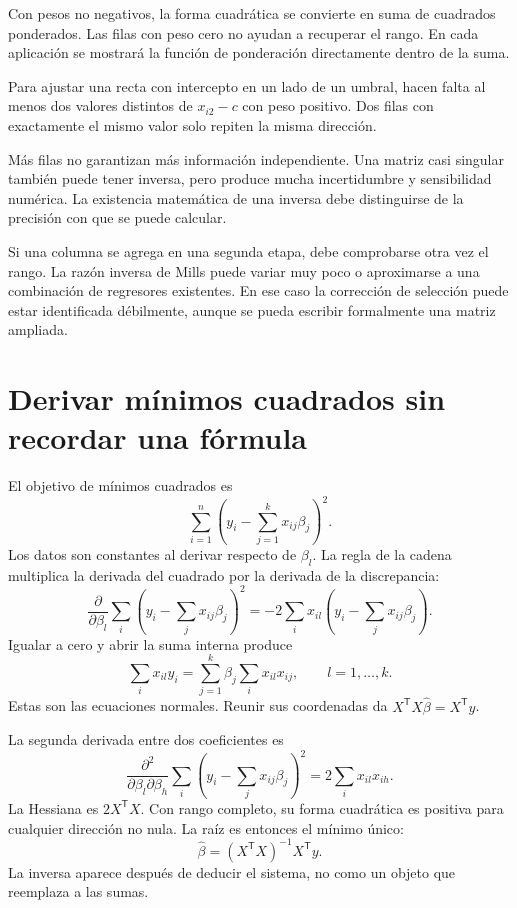 \documentclass[11pt,a4paper]{article}
\newcommand{\T}{^{\mathsf T}}
\begin{document}
Con pesos no negativos, la forma cuadrática
se convierte en suma de cuadrados ponderados.
Las filas con peso cero no ayudan a recuperar el rango.
En cada aplicación se mostrará la función
de ponderación directamente dentro de la suma.

\begin{ejemplo}
Para ajustar una recta con intercepto en un lado
de un umbral, hacen falta al menos dos valores
distintos de \(x_{i2}-c\) con peso positivo.
Dos filas con exactamente el mismo valor
solo repiten la misma dirección.
\end{ejemplo}
Más filas no garantizan más información independiente.
Una matriz casi singular también puede tener inversa,
pero produce mucha incertidumbre y sensibilidad numérica.
La existencia matemática de una inversa debe
distinguirse de la precisión con que se puede calcular.

Si una columna se agrega en una segunda etapa,
debe comprobarse otra vez el rango.
La razón inversa de Mills puede variar muy poco
o aproximarse a una combinación de regresores existentes.
En ese caso la corrección de selección puede
estar identificada débilmente, aunque se pueda
escribir formalmente una matriz ampliada.

\clearpage
\section{Derivar mínimos cuadrados sin recordar una fórmula}\label{unidad8}
El objetivo de mínimos cuadrados es
\[
\sum_{i=1}^n\left(y_i-\sum_{j=1}^kx_{ij}\beta_j\right)^2.
\]
Los datos son constantes al derivar respecto de \(\beta_l\).
La regla de la cadena multiplica la derivada del
cuadrado por la derivada de la discrepancia:
\[
\frac{\partial}{\partial\beta_l}
\sum_i\left(y_i-\sum_jx_{ij}\beta_j\right)^2
=-2\sum_i x_{il}\left(y_i-\sum_jx_{ij}\beta_j\right).
\]
Igualar a cero y abrir la suma interna produce
\[
\sum_i x_{il}y_i
=\sum_{j=1}^k\beta_j\sum_i x_{il}x_{ij},
\qquad l=1,\ldots,k.
\]
Estas son las ecuaciones normales.
Reunir sus coordenadas da \(X\T X\widehat\beta=X\T y\).

La segunda derivada entre dos coeficientes es
\[
\frac{\partial^2}{\partial\beta_l\partial\beta_h}
\sum_i\left(y_i-\sum_jx_{ij}\beta_j\right)^2
=2\sum_i x_{il}x_{ih}.
\]
La Hessiana es \(2X\T X\).
Con rango completo, su forma cuadrática es positiva
para cualquier dirección no nula.
La raíz es entonces el mínimo único:
\[
\widehat\beta=(X\T X)^{-1}X\T y.
\]
La inversa aparece después de deducir el sistema,
no como un objeto que reemplaza a las sumas.
\end{document}
